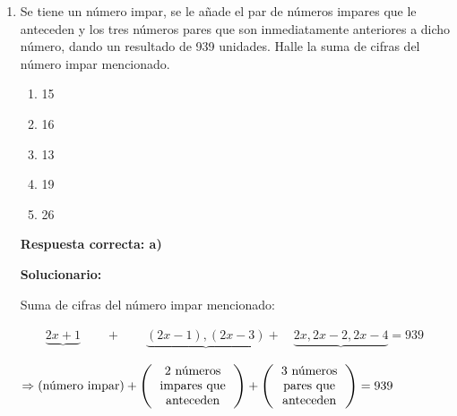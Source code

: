 \begin{enumerate}[resume]
\begin{center}
	\end{center}




	Aplicamos la suma en aspa:

	$0 + x = y + 3y \Rightarrow x = 4y$ .....(I)

	Planteando la primera afirmación:

	$(3y + 2x) + 3x = 46$

	$3y + 5x = 46$ .....(II)

	(I) en (II):

	$3y + 5(4y) = 46 \Rightarrow y = 2 \Rightarrow x = 8$

	$\therefore$ José tiene $3(8) = 24$ años.








	\item Se tiene un número impar, se le añade el par de números impares que le anteceden y los tres números pares que son inmediatamente anteriores a dicho número, dando un resultado de 939 unidades. Halle la suma de cifras del número impar mencionado.

	\begin{enumerate}[label=\alph*)]
		\item 15
		\item 16
		\item 13
		\item 19
		\item 26
	\end{enumerate}
	\textbf{Respuesta correcta: a)}

	\vspace{2mm}
	\textbf{Solucionario:}

	Suma de cifras del número impar mencionado:

	$\qquad\underbrace{2x+1}_{} \quad \quad +\qquad \underbrace{(2x-1), (2x-3)}_{} +\quad \underbrace{2x, 2x-2, 2x-4}_{} = 939$

	$\Rightarrow \left( \text{número impar} \right) + \left( \begin{tabular}{c} 2 números \\ impares que \\ anteceden \end{tabular} \right) + \left( \begin{tabular}{c} 3 números \\ pares que \\ anteceden \end{tabular} \right) = 939$



\end{enumerate}
